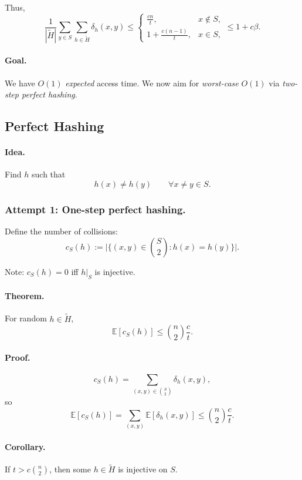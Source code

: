 \documentclass{article}
\begin{document}
Thus,
\[
\frac{1}{|\tilde{H}|}
  \sum_{y\in S}\sum_{h\in\tilde{H}}\delta_h(x,y)
\le
\begin{cases}
\frac{cn}{t}, & x\notin S,\\[4pt]
1 + \frac{c(n-1)}{t}, & x\in S,
\end{cases}
\le 1 + c\beta.
\]

\paragraph{Goal.}  
We have $O(1)$ \emph{expected} access time.  
We now aim for \emph{worst-case} $O(1)$ via \emph{two-step perfect hashing}.

\subsection{Perfect Hashing}

\paragraph{Idea.}  
Find $h$ such that  
\[
h(x) \neq h(y) \qquad \forall x\neq y \in S.
\]

\subsubsection{Attempt 1: One-step perfect hashing.}

Define the number of collisions:
\[
c_S(h) := \big|\{(x,y)\in \binom{S}{2} : h(x)=h(y)\}\big|.
\]

Note: $c_S(h)=0$ iff $h|_S$ is injective.

\paragraph{Theorem.}  
For random $h\in\tilde{H}$,
\[
\mathbb{E}[c_S(h)] \le \binom{n}{2}\frac{c}{t}.
\]

\paragraph{Proof.}
\[
c_S(h)
  = \sum_{(x,y)\in\binom{S}{2}}\delta_h(x,y),
\]
so
\[
\mathbb{E}[c_S(h)]
  = \sum_{(x,y)} \mathbb{E}[\delta_h(x,y)]
  \le \binom{n}{2}\frac{c}{t}.
\]

\paragraph{Corollary.}  
If $t > c\binom{n}{2}$, then some $h\in\tilde{H}$ is injective on $S$.
\end{document}
